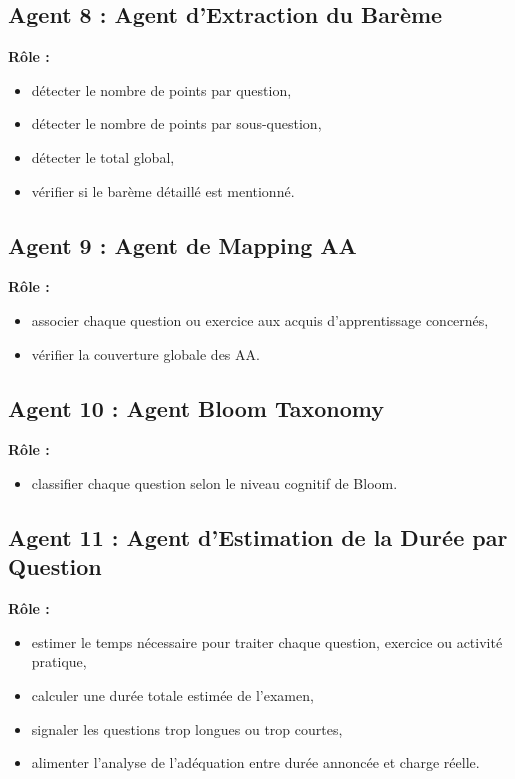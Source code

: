 \documentclass[12pt,a4paper]{article}
\begin{document}
\subsection*{Agent 8 : Agent d’Extraction du Barème}

\textbf{Rôle :}
\begin{itemize}[leftmargin=1cm]
    \item détecter le nombre de points par question,
    \item détecter le nombre de points par sous-question,
    \item détecter le total global,
    \item vérifier si le barème détaillé est mentionné.
\end{itemize}

\subsection*{Agent 9 : Agent de Mapping AA}

\textbf{Rôle :}
\begin{itemize}[leftmargin=1cm]
    \item associer chaque question ou exercice aux acquis d’apprentissage concernés,
    \item vérifier la couverture globale des AA.
\end{itemize}

\subsection*{Agent 10 : Agent Bloom Taxonomy}

\textbf{Rôle :}
\begin{itemize}[leftmargin=1cm]
    \item classifier chaque question selon le niveau cognitif de Bloom.
\end{itemize}

\subsection*{Agent 11 : Agent d’Estimation de la Durée par Question}

\textbf{Rôle :}
\begin{itemize}[leftmargin=1cm]
    \item estimer le temps nécessaire pour traiter chaque question, exercice ou activité pratique,
    \item calculer une durée totale estimée de l’examen,
    \item signaler les questions trop longues ou trop courtes,
    \item alimenter l’analyse de l’adéquation entre durée annoncée et charge réelle.
\end{itemize}
\end{document}
